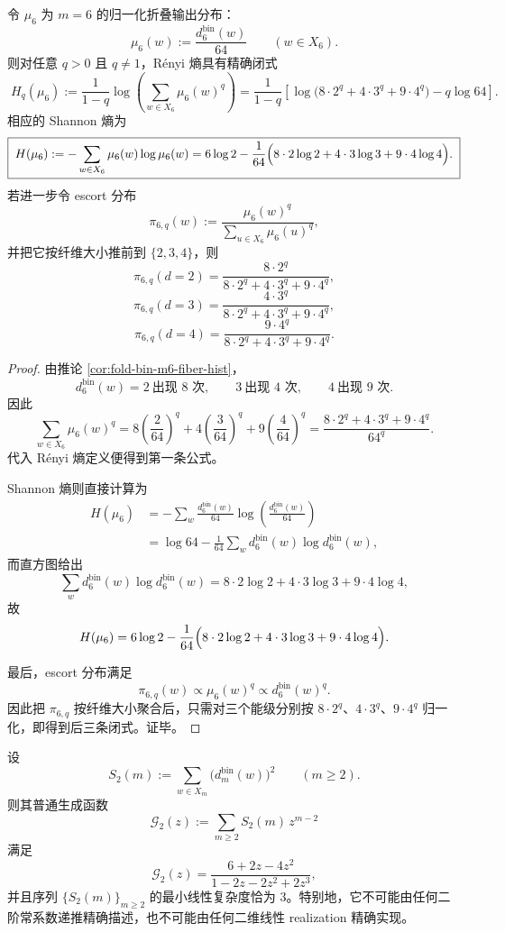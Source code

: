 \begin{theorem}\label{thm:conclusion-window6-full-renyi-thermodynamics-closed}
令 \(\mu_6\) 为 \(m=6\) 的归一化折叠输出分布：
\[
\mu_6(w):=\frac{d_6^{\mathrm{bin}}(w)}{64}
\qquad (w\in X_6).
\]
则对任意 \(q>0\) 且 \(q\neq 1\)，R\'enyi 熵具有精确闭式
\[
\boxed{\;
H_q(\mu_6)
:=
\frac{1}{1-q}\log\!\left(\sum_{w\in X_6}\mu_6(w)^q\right)
=
\frac{1}{1-q}
\left[
\log\!\bigl(8\cdot 2^q+4\cdot 3^q+9\cdot 4^q\bigr)-q\log 64
\right].\;}
\]
相应的 Shannon 熵为
\[
\boxed{\;
H(\mu_6)
:=
-\sum_{w\in X_6}\mu_6(w)\log\mu_6(w)
=
6\log 2
-\frac{1}{64}\Bigl(8\cdot 2\log 2+4\cdot 3\log 3+9\cdot 4\log 4\Bigr).\;}
\]
若进一步令 escort 分布
\[
\pi_{6,q}(w):=\frac{\mu_6(w)^q}{\sum_{u\in X_6}\mu_6(u)^q},
\]
并把它按纤维大小推前到 \(\{2,3,4\}\)，则
\[
\boxed{\;
\pi_{6,q}(d=2)=\frac{8\cdot 2^q}{8\cdot 2^q+4\cdot 3^q+9\cdot 4^q},\;}
\]
\[
\boxed{\;
\pi_{6,q}(d=3)=\frac{4\cdot 3^q}{8\cdot 2^q+4\cdot 3^q+9\cdot 4^q},\;}
\]
\[
\boxed{\;
\pi_{6,q}(d=4)=\frac{9\cdot 4^q}{8\cdot 2^q+4\cdot 3^q+9\cdot 4^q}.\;}
\]
\end{theorem}
\begin{proof}
由推论 \ref{cor:fold-bin-m6-fiber-hist}，
\[
d_6^{\mathrm{bin}}(w)=2\ \text{出现 }8\text{ 次},\qquad
3\ \text{出现 }4\text{ 次},\qquad
4\ \text{出现 }9\text{ 次}.
\]
因此
\[
\sum_{w\in X_6}\mu_6(w)^q
=
8\left(\frac{2}{64}\right)^q
+4\left(\frac{3}{64}\right)^q
+9\left(\frac{4}{64}\right)^q
=
\frac{8\cdot 2^q+4\cdot 3^q+9\cdot 4^q}{64^q}.
\]
代入 R\'enyi 熵定义便得到第一条公式。

Shannon 熵则直接计算为
\[
\begin{aligned}
H(\mu_6)
&=
-\sum_{w}\frac{d_6^{\mathrm{bin}}(w)}{64}
\log\!\left(\frac{d_6^{\mathrm{bin}}(w)}{64}\right)\\
&=
\log 64-\frac{1}{64}\sum_{w}d_6^{\mathrm{bin}}(w)\log d_6^{\mathrm{bin}}(w),
\end{aligned}
\]
而直方图给出
\[
\sum_{w}d_6^{\mathrm{bin}}(w)\log d_6^{\mathrm{bin}}(w)
=
8\cdot 2\log 2+4\cdot 3\log 3+9\cdot 4\log 4,
\]
故
\[
H(\mu_6)
=
6\log 2-\frac{1}{64}\Bigl(8\cdot 2\log 2+4\cdot 3\log 3+9\cdot 4\log 4\Bigr).
\]

最后，escort 分布满足
\[
\pi_{6,q}(w)\propto \mu_6(w)^q\propto d_6^{\mathrm{bin}}(w)^q.
\]
因此把 \(\pi_{6,q}\) 按纤维大小聚合后，只需对三个能级分别按 \(8\cdot 2^q\)、\(4\cdot 3^q\)、\(9\cdot 4^q\) 归一化，即得到后三条闭式。证毕。
\end{proof}

\begin{theorem}[二阶碰撞核的最小线性复杂度]\label{thm:conclusion-foldbin-s2-minimal-linear-complexity-three}
设
\[
S_2(m):=\sum_{w\in X_m}\bigl(d_m^{\mathrm{bin}}(w)\bigr)^2
\qquad (m\ge 2).
\]
则其普通生成函数
\[
\mathcal G_2(z):=\sum_{m\ge 2}S_2(m)\,z^{m-2}
\]
满足
\[
\mathcal G_2(z)=\frac{6+2z-4z^2}{1-2z-2z^2+2z^3},
\]
并且序列 \(\{S_2(m)\}_{m\ge 2}\) 的最小线性复杂度恰为 \(3\)。特别地，它不可能由任何二阶常系数递推精确描述，也不可能由任何二维线性 realization 精确实现。
\end{theorem}

